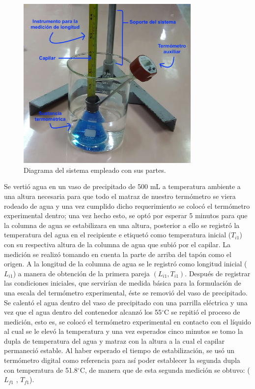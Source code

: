 \documentclass{article}
\begin{document}
\begin{figure}[H]
    \centering
    \includegraphics[width=9cm]{Sistema.jpeg}%
    \caption{Diagrama del sistema empleado con sus partes.}%
\end{figure}

Se vertió agua en un vaso de precipitado de 500 mL a temperatura ambiente a una altura necesaria para que todo el matraz de nuestro termómetro se viera rodeado de agua y una vez cumplido dicho requerimiento se colocó el termómetro experimental dentro; una vez hecho esto, se optó por esperar 5 minutos  para que la columna de agua se estabilizara en una altura, posterior a ello se registró la temperatura del agua en el recipiente e etiquetó como temperatura inicial ($T_{i1}$) con su respectiva altura de la columna de agua que subió por el capilar. La medición se realizó tomando en cuenta la parte de arriba del tapón como el origen. A la longitud de la columna de agua se le registró como longitud inicial ($L_{i1}$) a manera de obtención de la primera pareja $(L_{i1} , T_{i1})$. Después de registrar las condiciones iniciales, que servirían de medida básica para la formulación de una escala del termómetro experimental, éste se removió del vaso de precipitado. Se calentó el agua dentro del vaso de precipitado con una parrilla eléctrica y una vez que el agua dentro del contenedor alcanzó los 55$^{\circ}$C  se repitió el proceso de medición, esto es, se colocó el termómetro experimental en contacto con el líquido al cual se le elevó la temperatura y una vez esperados cinco minutos se tomo la dupla de temperatura del agua y matraz con la altura a la cual el capilar permaneció estable. Al haber esperado el tiempo de estabilización, se usó un termómetro digital como referencia para así poder establecer la segunda dupla con temperatura de 51.8$^{\circ}$C, de manera que de esta segunda medición se obtuvo:  ($L_{f1}$ , $T_{f1}$).
\end{document}

